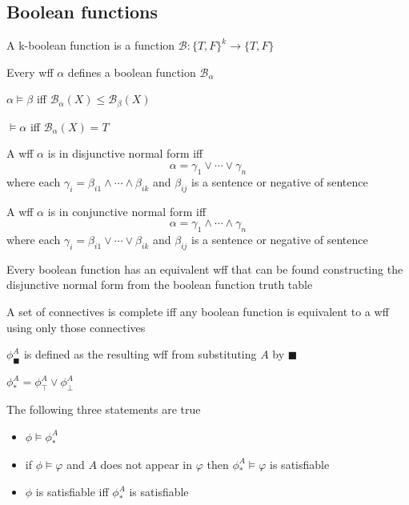 \documentclass[../main.tex]{subfiles}
\begin{document}
\subsection{Boolean functions}


\begin{definition}
    A k-boolean function is a function $\mathcal{B}:\{T,F\}^k\rightarrow\{T,F\}$
\end{definition}
\begin{theorem}
    Every wff $\alpha$ defines a boolean function $\mathcal{B}_\alpha$
\end{theorem}
\begin{theorem}
    $\alpha\models\beta$ iff $\mathcal{B}_\alpha(X)\le\mathcal{B}_\beta(X)$
\end{theorem}
\begin{theorem}
    $\models\alpha$ iff $\mathcal{B}_\alpha(X)=T$
\end{theorem}
\begin{definition}
    A wff $\alpha$ is in disjunctive normal form iff
    $$
    \alpha=\gamma_1\vee\cdots\vee\gamma_n
    $$
    where each $\gamma_i=\beta_{i1}\wedge\cdots\wedge\beta_{ik}$ and $\beta_{ij}$ is a sentence or negative of sentence
\end{definition}
\begin{definition}
    A wff $\alpha$ is in conjunctive normal form iff
    $$
    \alpha=\gamma_1\wedge\cdots\wedge\gamma_n
    $$
    where each $\gamma_i=\beta_{i1}\vee\cdots\vee\beta_{ik}$ and $\beta_{ij}$ is a sentence or negative of sentence
\end{definition}
\begin{theorem}
    Every boolean function has an equivalent wff that can be found constructing the disjunctive normal form from the boolean function truth table
\end{theorem}
\begin{definition}
    A set of connectives is complete iff any boolean function is equivalent to a wff using only those connectives
\end{definition}
\begin{definition}[Substitution]
    $\phi_\blacksquare^A$ is defined as the resulting wff from substituting $A$ by $\blacksquare$
\end{definition}
\begin{definition}[Resolution]
    $\phi_*^A = \phi_\top^A \vee \phi_\bot^A$
\end{definition}
\begin{theorem}
    The following three statements are true
    \begin{itemize}
        \item $\phi\models\phi_*^A$
        \item if $\phi\models\varphi$ and $A$ does not appear in $\varphi$ then $\phi_*^A\models\varphi$ is satisfiable
        \item $\phi$ is satisfiable iff $\phi_*^A$ is satisfiable
    \end{itemize}
\end{theorem}
\end{document}
